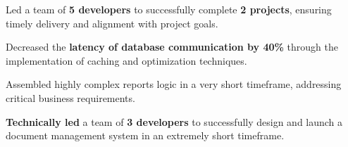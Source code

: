 \begin{tightemize}
    \item Led a team of \textbf{5 developers} to successfully complete \textbf{2 projects}, ensuring timely delivery and alignment with project goals.

    \item Decreased the \textbf{latency of database communication by 40\%} through the implementation of caching and optimization techniques.

    \item Assembled highly complex reports logic in a very short timeframe, addressing critical business requirements.

\end{tightemize}
\sectionsep


\begin{tightemize}
    \item \textbf{Technically led} a team of \textbf{3 developers} to successfully design and launch a document management system in an extremely short
    timeframe.
\end{tightemize}
\sectionsep

\sectionsep

\sectionsep

\sectionsep